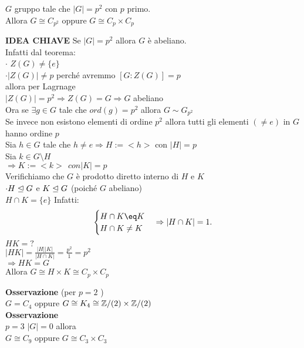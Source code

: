 \documentclass[12px]{article}
\begin{document}
	\begin{coro}
		$G$ gruppo tale che $|G| = p^2$ con  $p$ primo.\\
		Allora $G\cong C_{p^2}$ oppure $G\cong C_p\times C_p$
	\end{coro}
	\begin{dimo}
		\textbf{IDEA CHIAVE} Se $|G| = p^2$ allora  $G$ è abeliano.\\
		Infatti dal teorema:\\
		$\cdot$ $Z(G)\neq\{e\}$\\
		$\cdot |Z(G)|\neq p$ perché avremmo $[G:Z(G)]=p$\\
		allora per Lagrnage\\
		$|Z(G)| = p^2 \Rightarrow Z(G) = G \Rightarrow  G$ abeliano\\
		Ora se $\exists g\in G$ tale che  $ord(g) = p^2$ allora  $G\sim G_{p^2}$\\
		Se invece non esistono elementi di ordine  $p^2$ allora tutti gli elementi  $(\neq e)$ in $G$ hanno ordine $p$\\
		Sia $h\in G$ tale che $h\neq e \Rightarrow H:=<h>$ con $|H| = p$\\
		Sia  $k\in G\setminus H$\\
		 $ \Rightarrow K := <k> \ \ con |K|  = p$ \\
		 Verifichiamo che $G$ è prodotto diretto interno di $H$ e $K$\\
		  $\cdot H\trianglelefteq G$ e $K\trianglelefteq G$ (poiché $G$ abeliano)\\
		  $H\cap K = \{e\}$ Infatti:\\
		 \[\begin{cases}
			H\cap K \eq K\\
			H\cap K\neq K
		\end{cases} \Rightarrow |H\cap K| = 1.\]
		$HK = ?$\\
		$|HK| = \frac{|H||K|}{|H\cap K|} = \frac{p^2}1 = p^2$\\
		 $ \Rightarrow HK = G$ \\
		 Allora $G\cong H\times K\cong C_p\times C_p$
		
	\end{dimo} 
	\textbf{Osservazione} (per $p = 2$ )\\
	$G = C_4$ oppure $G\cong K_4 \cong \mathbb{Z}/(2)\times\mathbb{Z}/(2)$\\
	 \textbf{Osservazione}\\
	 $p = 3$ $|G| = 0$ allora\\
	  $G\cong C_9$ oppure $G\cong C_3\times C_3$\\
\end{document}
